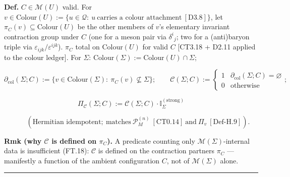 \begin{definition}\label{tag:Def-H-10}
\textbf{Def.} $C\in\mathcal M(U)$ valid. For $v\in\mathrm{Colour}(U):=\{u\in\mathcal Q:\ u\ \text{carries a colour attachment}\ [\mathrm{D3.8}]\}$, let $\pi_C(v)\subseteq\mathrm{Colour}(U)$ be the other members of $v$'s elementary invariant contraction group under $C$ (one for a meson pair via $\delta^i{}_j$; two for a (anti)baryon triple via $\varepsilon_{ijk}/\varepsilon^{ijk}$). $\pi_C$ total on $\mathrm{Colour}(U)$ for valid $C$ [CT3.18 + D2.11 applied to the colour ledger]. For $\Sigma$: $\mathrm{Colour}(\Sigma):=\mathrm{Colour}(U)\cap\Sigma$;

\[
\partial_{\mathrm{col}}(\Sigma;C):=\{v\in\mathrm{Colour}(\Sigma):\ \pi_C(v)\not\subseteq\Sigma\};\qquad
\mathcal C(\Sigma;C):=\begin{cases}1&\partial_{\mathrm{col}}(\Sigma;C)=\varnothing\\ 0&\text{otherwise}\end{cases};
\]

\[
\Pi_{\mathcal C}(\Sigma;C):=\mathcal C(\Sigma;C)\cdot\mathbb I_\Sigma^{(\mathrm{strong})}
\]

\[
\qquad (\text{Hermitian idempotent};\ \text{matches}\ \mathcal P_M^{(n)}\ [\mathrm{CT0.14}]\ \text{and}\ \Pi_v\ [\mathrm{Def\text{-}H.9}]).
\]

\textbf{Rmk (why $\mathcal C$ is defined on $\pi_C$).} A predicate counting only $\mathcal M(\Sigma)$-internal data is insufficient (FT.18): $\mathcal C$ is defined on the contraction partners $\pi_C$ — manifestly a function of the ambient configuration $C$, not of $\mathcal M(\Sigma)$ alone.

\vspace{2pt}\noindent\rule{\textwidth}{0.4pt}\vspace{2pt}

\end{definition}

